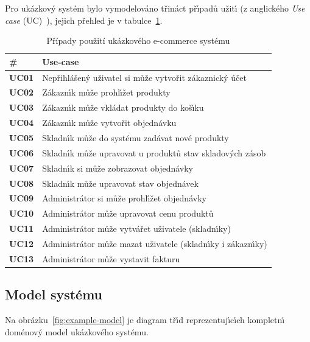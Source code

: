Pro ukázkov\'y systém bylo vymodelováno třináct př\'{\i}padů užit\'{\i}
(z anglického \textit{Use case} (\gls{UC})~\cite{bittner2002use}), jejich
přehled je v tabulce~\ref{tbl:use-cases}.

\begin{table}[h]
    \centering
    \begin{tabular*}{\textwidth}{ l l }
        \hline
        \textbf{\#} & \textbf{Use-case} \\
        \hline \hline
        \textbf{UC01} & Nepřihlášen\'y uživatel si může vytvořit zákaznick\'y účet \\
        \textbf{UC02} & Zákazn\'{\i}k může prohl\'{\i}žet produkty \\
        \textbf{UC03} & Zákazn\'{\i}k může vkládat produkty do koš\'{\i}ku \\
        \textbf{UC04} & Zákazn\'{\i}k může vytvořit objednávku \\
        \textbf{UC05} & Skladn\'{\i}k může do systému zadávat nové produkty \\
        \textbf{UC06} & Skladn\'{\i}k může upravovat u produktů stav skladov\'ych zásob \\
        \textbf{UC07} & Skladn\'{\i}k si může zobrazovat objednávky \\
        \textbf{UC08} & Skladn\'{\i}k může upravovat stav objednávek \\
        \textbf{UC09} & Administrátor si může prohl\'{\i}žet objednávky \\
        \textbf{UC10} & Administrátor může upravovat cenu produktů \\
        \textbf{UC11} & Administrátor může vytvářet uživatele (skladn\'{\i}ky) \\
        \textbf{UC12} & Administrátor může mazat uživatele (skladn\'{\i}ky i zákazn\'{\i}ky) \\
        \textbf{UC13} & Administrátor může vystavit fakturu \\
        \hline
    \end{tabular*}
    \caption{Případy použití ukázkového e-commerce systému}
    \label{tbl:use-cases}
\end{table}

\subsection{Model systému}

Na obrázku~\ref{fig:example-model} je diagram tř\'{\i}d reprezentuj\'{\i}c\'{\i}ch
kompletn\'{\i} doménov\'y model ukázkového systému.

